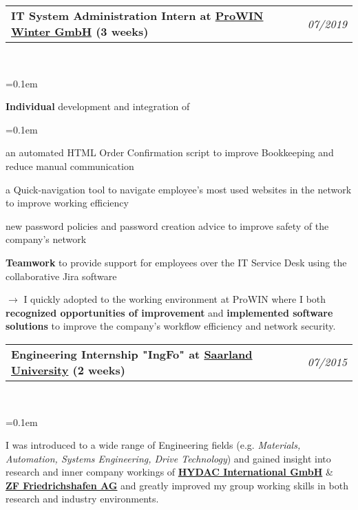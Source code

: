 \documentclass[10pt,letterpaper]{article}
\makeatletter
\newcommand{\headerrow}[2]
{\begin{tabular*}{\linewidth}{l@{\extracolsep{\fill}}r}
	#1 &
	#2 \\
\end{tabular*}}
\makeatother
\begin{document}
\noindent
\headerrow{\textbf{IT System Administration Intern at \href{https://www.prowin.net/}{ProWIN Winter GmbH} (3 weeks)}}{\emph{07/2019}}
\\
\vspace{-1.6em}
\begin{itemize*}
	\parskip=0.1em
	\item \textbf{Individual} development and integration of 
	\begin{enumerate*}
		\parskip=0.1em
		\item an automated HTML Order Confirmation script to improve Bookkeeping and reduce manual communication
		\item a Quick-navigation tool to navigate employee's most used websites in the network to improve working efficiency
		\item new password policies and password creation advice to improve safety of the company's network
	\end{enumerate*}
	\item \textbf{Teamwork} to provide support for employees over the IT Service Desk using the collaborative Jira software
	\vspace{2mm}
	\item [$\rightarrow$] I quickly adopted to the working environment at ProWIN where I both \textbf{recognized opportunities of improvement} 
	and \textbf{implemented software solutions} to improve the company's workflow efficiency and network security.
\end{itemize*}

\noindent
\headerrow{\textbf{Engineering Internship "IngFo" at \href{https://www.uni-saarland.de/nc/en/home.html}{Saarland University} (2 weeks)}}{\emph{07/2015}}
\\
\vspace{-1.6em}
\begin{itemize*}
	\parskip=0.1em
    \item I was introduced to a wide range of Engineering fields (e.g.\emph{ Materials, Automation, Systems Engineering, Drive Technology}) and
	  gained insight into research and inner company workings of \href{https://www.hydac.com/uk-en/start.html}{\textbf{HYDAC International GmbH}} \&  \\\href{https://www.zf.com/mobile/en/homepage/homepage.html}{\textbf{ZF Friedrichshafen AG}} and greatly improved my group working skills in both research and industry environments.
\end{itemize*}
\end{document}
